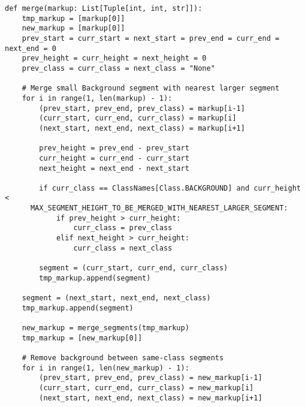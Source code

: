 \begin{lstlisting}[caption={Функция создания объединенной разметки (часть 1)}, label={lst:merged}]
def merge(markup: List[Tuple[int, int, str]]):
    tmp_markup = [markup[0]]
    new_markup = [markup[0]]
    prev_start = curr_start = next_start = prev_end = curr_end = next_end = 0
    prev_height = curr_height = next_height = 0
    prev_class = curr_class = next_class = "None"
    
    # Merge small Background segment with nearest larger segment
    for i in range(1, len(markup) - 1):
        (prev_start, prev_end, prev_class) = markup[i-1]
        (curr_start, curr_end, curr_class) = markup[i]
        (next_start, next_end, next_class) = markup[i+1]

        prev_height = prev_end - prev_start
        curr_height = curr_end - curr_start
        next_height = next_end - next_start

        if curr_class == ClassNames[Class.BACKGROUND] and curr_height <
      MAX_SEGMENT_HEIGHT_TO_BE_MERGED_WITH_NEAREST_LARGER_SEGMENT:
            if prev_height > curr_height:
                curr_class = prev_class
            elif next_height > curr_height:
                curr_class = next_class

        segment = (curr_start, curr_end, curr_class)
        tmp_markup.append(segment)

    segment = (next_start, next_end, next_class)
    tmp_markup.append(segment)

    new_markup = merge_segments(tmp_markup)
    tmp_markup = [new_markup[0]]

    # Remove background between same-class segments
    for i in range(1, len(new_markup) - 1):
        (prev_start, prev_end, prev_class) = new_markup[i-1]
        (curr_start, curr_end, curr_class) = new_markup[i]
        (next_start, next_end, next_class) = new_markup[i+1]
\end{lstlisting}

\newpage


